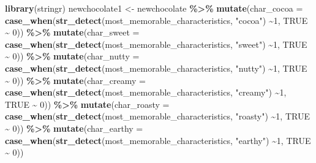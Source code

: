\documentclass[
]{article}
\newenvironment{Shaded}{\begin{snugshade}}{\end{snugshade}}
\newcommand{\AttributeTok}[1]{\textcolor[rgb]{0.13,0.29,0.53}{#1}}
\newcommand{\ConstantTok}[1]{\textcolor[rgb]{0.56,0.35,0.01}{#1}}
\newcommand{\DecValTok}[1]{\textcolor[rgb]{0.00,0.00,0.81}{#1}}
\newcommand{\FunctionTok}[1]{\textcolor[rgb]{0.13,0.29,0.53}{\textbf{#1}}}
\newcommand{\NormalTok}[1]{#1}
\newcommand{\OtherTok}[1]{\textcolor[rgb]{0.56,0.35,0.01}{#1}}
\newcommand{\SpecialCharTok}[1]{\textcolor[rgb]{0.81,0.36,0.00}{\textbf{#1}}}
\newcommand{\StringTok}[1]{\textcolor[rgb]{0.31,0.60,0.02}{#1}}
\begin{document}
\begin{Shaded}
\begin{Highlighting}[]
\FunctionTok{library}\NormalTok{(stringr)}
\NormalTok{newchocolate1 }\OtherTok{\textless{}{-}}\NormalTok{ newchocolate }\SpecialCharTok{\%\textgreater{}\%} \FunctionTok{mutate}\NormalTok{(}\AttributeTok{char\_cocoa =} \FunctionTok{case\_when}\NormalTok{(}\FunctionTok{str\_detect}\NormalTok{(most\_memorable\_characteristics, }\StringTok{"cocoa"}\NormalTok{) }\SpecialCharTok{\textasciitilde{}}\DecValTok{1}\NormalTok{, }\ConstantTok{TRUE} \SpecialCharTok{\textasciitilde{}} \DecValTok{0}\NormalTok{)) }\SpecialCharTok{\%\textgreater{}\%} \FunctionTok{mutate}\NormalTok{(}\AttributeTok{char\_sweet =} \FunctionTok{case\_when}\NormalTok{(}\FunctionTok{str\_detect}\NormalTok{(most\_memorable\_characteristics, }\StringTok{"sweet"}\NormalTok{) }\SpecialCharTok{\textasciitilde{}}\DecValTok{1}\NormalTok{, }\ConstantTok{TRUE} \SpecialCharTok{\textasciitilde{}} \DecValTok{0}\NormalTok{)) }\SpecialCharTok{\%\textgreater{}\%} \FunctionTok{mutate}\NormalTok{(}\AttributeTok{char\_nutty =} \FunctionTok{case\_when}\NormalTok{(}\FunctionTok{str\_detect}\NormalTok{(most\_memorable\_characteristics, }\StringTok{"nutty"}\NormalTok{) }\SpecialCharTok{\textasciitilde{}}\DecValTok{1}\NormalTok{, }\ConstantTok{TRUE} \SpecialCharTok{\textasciitilde{}} \DecValTok{0}\NormalTok{)) }\SpecialCharTok{\%\textgreater{}\%} \FunctionTok{mutate}\NormalTok{(}\AttributeTok{char\_creamy =} \FunctionTok{case\_when}\NormalTok{(}\FunctionTok{str\_detect}\NormalTok{(most\_memorable\_characteristics, }\StringTok{"creamy"}\NormalTok{) }\SpecialCharTok{\textasciitilde{}}\DecValTok{1}\NormalTok{, }\ConstantTok{TRUE} \SpecialCharTok{\textasciitilde{}} \DecValTok{0}\NormalTok{)) }\SpecialCharTok{\%\textgreater{}\%} \FunctionTok{mutate}\NormalTok{(}\AttributeTok{char\_roasty =} \FunctionTok{case\_when}\NormalTok{(}\FunctionTok{str\_detect}\NormalTok{(most\_memorable\_characteristics, }\StringTok{"roasty"}\NormalTok{) }\SpecialCharTok{\textasciitilde{}}\DecValTok{1}\NormalTok{, }\ConstantTok{TRUE} \SpecialCharTok{\textasciitilde{}} \DecValTok{0}\NormalTok{)) }\SpecialCharTok{\%\textgreater{}\%} \FunctionTok{mutate}\NormalTok{(}\AttributeTok{char\_earthy =} \FunctionTok{case\_when}\NormalTok{(}\FunctionTok{str\_detect}\NormalTok{(most\_memorable\_characteristics, }\StringTok{"earthy"}\NormalTok{) }\SpecialCharTok{\textasciitilde{}}\DecValTok{1}\NormalTok{, }\ConstantTok{TRUE} \SpecialCharTok{\textasciitilde{}} \DecValTok{0}\NormalTok{))}


\end{Highlighting}
\end{Shaded}
\end{document}
